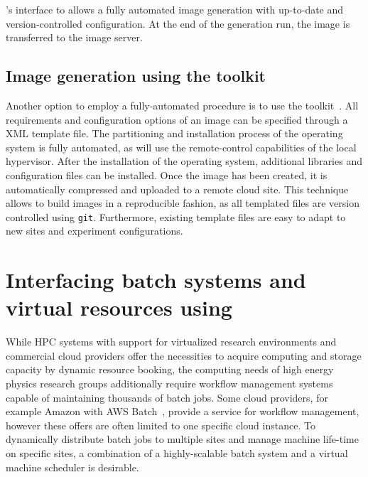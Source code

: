 \Packer's interface to \Puppet allows a fully automated image generation with up-to-date and version-controlled configuration. At the end of the generation run, the image is  transferred to the \Openstack image server.







\subsection{Image generation using the \OZ toolkit}


Another option to employ a fully-automated procedure is to use the \OZ toolkit~\cite{OZ}. All requirements and configuration options of an image can be specified through a XML template file. The partitioning and installation process of the operating system is fully automated, as \OZ will use the remote-control capabilities of the local hypervisor. After the installation of the operating system, additional libraries and configuration files can be installed. Once the image has been created, it is automatically compressed and uploaded to a remote cloud site.
This technique allows to build images in a reproducible fashion, as all templated files are version controlled using \texttt{git}. Furthermore, existing template files are easy to adapt to new sites and experiment configurations.



\section{Interfacing batch systems and virtual resources using \Roced}
\label{section:roced}
While HPC systems with support for virtualized research environments and commercial cloud providers offer the
necessities to acquire computing and storage capacity by dynamic
resource booking, the computing needs of high energy physics
re\-search groups ad\-di\-tion\-al\-ly require work\-flow
ma\-na\-ge\-ment sys\-tems capable of maintaining thousands of batch
jobs. Some cloud providers, for example Amazon with AWS
Batch~\cite{awsbatch}, provide a service for workflow management,
however these offers are often limited to one specific cloud instance. To dynamically distribute batch jobs to multiple sites and manage machine life-time on specific sites, a combination of a highly-scalable batch system and a virtual machine scheduler is desirable.

